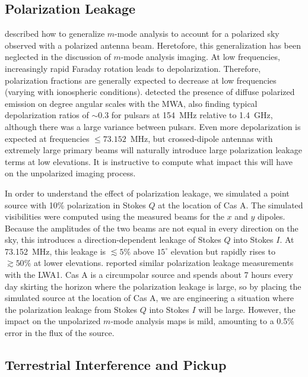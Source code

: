 \begin{bibunit}
\subsection{Polarization Leakage}

\citet{2015PhRvD..91h3514S} described how to generalize $m$-mode analysis to account for a polarized
sky observed with a polarized antenna beam. Heretofore, this generalization has been neglected in the
discussion of $m$-mode analysis imaging.  At low frequencies, increasingly rapid Faraday rotation
leads to depolarization. Therefore, polarization fractions are generally expected to decrease at low
frequencies (varying with ionospheric conditions). \citet{2016ApJ...830...38L} detected the presence
of diffuse polarized emission on degree angular scales with the MWA, also finding typical
depolarization ratios of $\sim0.3$ for pulsars at 154~MHz relative to 1.4~GHz, although there was a
large variance between pulsars. Even more depolarization is expected at frequencies $\le
73.152$~MHz, but crossed-dipole antennas with extremely large primary beams will naturally introduce
large polarization leakage terms at low elevations.  It is instructive to compute what impact this
will have on the unpolarized imaging process.

In order to understand the effect of polarization leakage, we simulated a point source with 10\%
polarization in Stokes $Q$ at the location of Cas A.  The simulated visibilities were computed using
the measured beams for the $x$ and $y$ dipoles. Because the amplitudes of the two beams are not equal in
every direction on the sky, this introduces a direction-dependent leakage of Stokes $Q$ into
Stokes $I$. At 73.152~MHz, this leakage is $\lesssim5\%$ above $15^\circ$ elevation but rapidly
rises to $\gtrsim50\%$ at lower elevations. \citet{2015JAI.....450004O} reported similar polarization
leakage measurements with the LWA1.  Cas A is a circumpolar source and spends about 7 hours
every day skirting the horizon where the polarization leakage is large, so by placing the simulated
source at the location of Cas A, we are engineering a situation where the polarization leakage from
Stokes $Q$ into Stokes $I$ will be large. However, the impact on the unpolarized $m$-mode analysis
maps is mild, amounting to a 0.5\% error in the flux of the source.

\subsection{Terrestrial Interference and Pickup}\label{sec:rfi}


\end{bibunit}
